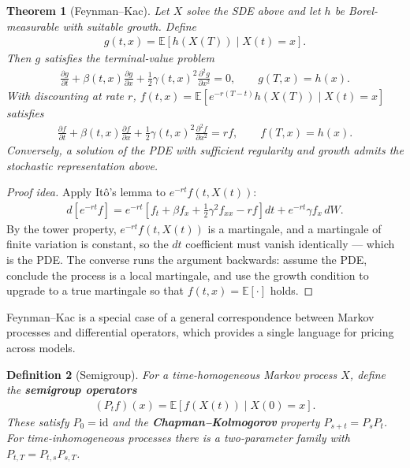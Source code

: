 \documentclass{report}
\theoremstyle{spacedplain}
\newtheorem{theorem}{Theorem}[section]
\theoremstyle{spaceddefinition}
\newtheorem{definition}[theorem]{Definition}
\theoremstyle{spacedremark}
\begin{document}
\begin{theorem}[Feynman--Kac]
Let $X$ solve the SDE above and let $h$ be Borel-measurable with suitable growth. Define
\begin{align}
    g(t,x) = \mathbb{E}\!\left[h(X(T)) \mid X(t) = x\right].
\end{align}
Then $g$ satisfies the terminal-value problem
\begin{align}
    \frac{\partial g}{\partial t} + \beta(t,x)\frac{\partial g}{\partial x} + \frac{1}{2}\gamma(t,x)^2 \frac{\partial^2 g}{\partial x^2} = 0, \qquad g(T,x) = h(x).
\end{align}
With discounting at rate $r$, $f(t,x) = \mathbb{E}\!\left[e^{-r(T-t)}h(X(T)) \mid X(t)=x\right]$ satisfies
\begin{align}
    \frac{\partial f}{\partial t} + \beta(t,x)\frac{\partial f}{\partial x} + \frac{1}{2}\gamma(t,x)^2 \frac{\partial^2 f}{\partial x^2} = rf, \qquad f(T,x) = h(x).
\end{align}
Conversely, a solution of the PDE with sufficient regularity and growth admits the stochastic representation above.
\end{theorem}
\begin{proof}[Proof idea]
Apply It\^o's lemma to $e^{-rt}f(t,X(t))$:
\begin{align}
    d\!\left[e^{-rt}f\right] = e^{-rt}\!\left[f_t + \beta f_x + \tfrac12\gamma^2 f_{xx} - rf\right]dt + e^{-rt}\gamma f_x\,dW .
\end{align}
By the tower property, $e^{-rt}f(t,X(t))$ is a martingale, and a martingale of finite variation is constant, so the $dt$ coefficient must vanish identically --- which is the PDE. The converse runs the argument backwards: assume the PDE, conclude the process is a local martingale, and use the growth condition to upgrade to a true martingale so that $f(t,x)=\mathbb{E}[\cdot]$ holds.
\end{proof}

Feynman--Kac is a special case of a general correspondence between Markov processes and differential operators, which provides a single language for pricing across models.

\begin{definition}[Semigroup]
For a time-homogeneous Markov process $X$, define the \textbf{semigroup operators}
\begin{align}
    (P_t f)(x) = \mathbb{E}[f(X(t)) \mid X(0) = x].
\end{align}
These satisfy $P_0 = \mathrm{id}$ and the \textbf{Chapman--Kolmogorov} property $P_{s+t} = P_s P_t$. For time-inhomogeneous processes there is a two-parameter family with $P_{t,T} = P_{t,s}P_{s,T}$.
\end{definition}
\end{document}

